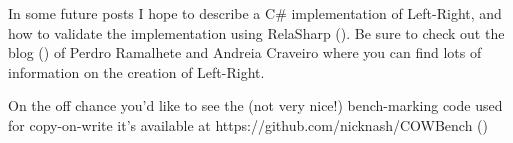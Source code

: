 \documentclass[11pt]{article}
\begin{document}
In some future posts I hope to describe a C\# implementation of Left-Right, and how to validate the implementation using RelaSharp (\texttt{}). Be sure to check out the blog (\texttt{}) of Perdro Ramalhete and Andreia Craveiro where you can find lots of information on the creation of Left-Right.

On the off chance you'd like to see the (not very nice!) bench-marking code used for copy-on-write it's available at https://github.com/nicknash/COWBench (\texttt{})
\end{document}
